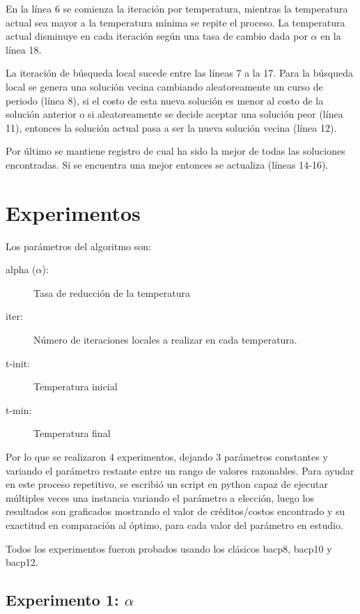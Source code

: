 \documentclass[letterpaper,10pt]{article}
\begin{document}
En la línea 6 se comienza la iteración por temperatura, mientras la temperatura actual sea mayor a la temperatura mínima se repite el proceso. La temperatura actual disminuye en cada iteración según una tasa de cambio dada por $\alpha$ en la línea 18.

La iteración de búsqueda local sucede entre las líneas 7 a la 17. Para la búsqueda local se genera una solución vecina cambiando aleatoreamente un curso de periodo (línea 8), si el costo de esta nueva solución es menor al costo de la solución anterior o si aleatoreamente se decide aceptar una solución peor (línea 11), entonces la solución actual pasa a ser la nueva solución vecina (línea 12).

Por último se mantiene registro de cual ha sido la mejor de todas las soluciones encontradas. Si se encuentra una mejor entonces se actualiza (líneas 14-16).

\section{Experimentos}

Los parámetros del algoritmo son:

\begin{description}
  \item[alpha ($\alpha$):] Tasa de reducción de la temperatura
  \item[iter:] Número de iteraciones locales a realizar en cada temperatura.
  \item[t-init:] Temperatura inicial
  \item[t-min:] Temperatura final
\end{description}

Por lo que se realizaron 4 experimentos, dejando 3 parámetros constantes y variando el parámetro restante entre un rango de valores razonables. Para ayudar en este proceso repetitivo, se escribió un script en python capaz de ejecutar múltiples veces una instancia variando el parámetro a elección, luego los resultados son graficados mostrando el valor de créditos/costos encontrado y su exactitud en comparación al óptimo, para cada valor del parámetro en estudio.

Todos los experimentos fueron probados usando los clásicos bacp8, bacp10 y bacp12.

\subsection{Experimento 1: $\alpha$}
\end{document}
